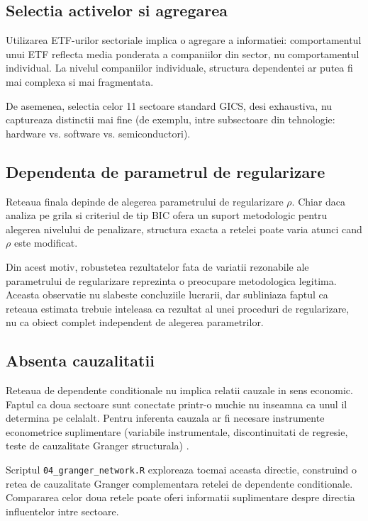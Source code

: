 \subsection{Selectia activelor si agregarea}

Utilizarea ETF-urilor sectoriale implica o agregare a informatiei: comportamentul
unui ETF reflecta media ponderata a companiilor din sector, nu comportamentul
individual. La nivelul companiilor individuale, structura dependentei ar putea
fi mai complexa si mai fragmentata.

De asemenea, selectia celor 11 sectoare standard GICS, desi exhaustiva, nu
captureaza distinctii mai fine (de exemplu, intre subsectoare din tehnologie:
hardware vs. software vs. semiconductori).

\subsection{Dependenta de parametrul de regularizare}

Reteaua finala depinde de alegerea parametrului de regularizare $\rho$.
Chiar daca analiza pe grila si criteriul de tip BIC ofera un suport metodologic
pentru alegerea nivelului de penalizare, structura exacta a retelei poate varia
atunci cand $\rho$ este modificat.

Din acest motiv, robustetea rezultatelor fata de variatii rezonabile ale
parametrului de regularizare reprezinta o preocupare metodologica legitima.
Aceasta observatie nu slabeste concluziile lucrarii, dar subliniaza faptul ca
reteaua estimata trebuie inteleasa ca rezultat al unei proceduri de regularizare,
nu ca obiect complet independent de alegerea parametrilor.

\subsection{Absenta cauzalitatii}

Reteaua de dependente conditionale nu implica relatii cauzale in sens economic.
Faptul ca doua sectoare sunt conectate printr-o muchie nu inseamna ca unul il
determina pe celalalt. Pentru inferenta cauzala ar fi necesare instrumente
econometrice suplimentare (variabile instrumentale, discontinuitati de regresie,
teste de cauzalitate Granger structurala) \cite{lutkepohl2005}.

Scriptul \texttt{04\_granger\_network.R} exploreaza tocmai aceasta directie,
construind o retea de cauzalitate Granger complementara retelei de dependente
conditionale. Compararea celor doua retele poate oferi informatii suplimentare
despre directia influentelor intre sectoare.


